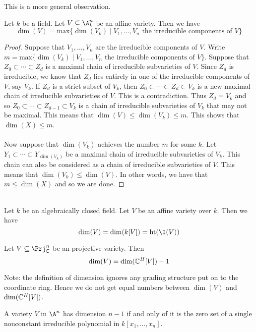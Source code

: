\documentclass[a4paper]{article}
\begin{document}
This is a more general observation. 

\begin{lmm}{}{} Let $k$ be a field. Let $V\subseteq\A_k^n$ be an affine variety. Then we have $$\dim(V)=\text{max}\{\dim(V_k)\;|\;V_1,\dots,V_n\text{ the irreducible components of }V\}$$ 
\begin{proof}
Suppose that $V_1,\dots,V_n$ are the irreducible components of $V$. Write $m=\text{max}\{\dim(V_k)\;|\;V_1,\dots,V_n\text{ the irreducible components of }V\}$. Suppose that $Z_0\subset\cdots\subset Z_d$ is a maximal chain of irreducible subvarieties of $V$. Since $Z_d$ is irreducible, we know that $Z_d$ lies entirely in one of the irreducible components of $V$, say $V_k$. If $Z_d$ is a strict subset of $V_k$, then $Z_0\subset\cdots\subset Z_d\subset V_k$ is a new maximal chain of irreducible subvarieties of $V$. This is a contradiction. Thus $Z_d=V_k$ and so $Z_0\subset\cdots\subset Z_{d-1}\subset V_k$ is a chain of irreducible subvarieties of $V_k$ that may not be maximal. This means that $\dim(V)\leq\dim(V_k)\leq m$. This shows that $\dim(X)\leq m$. \\~\\

Now suppose that $\dim(V_k)$ achieves the number $m$ for some $k$. Let $Y_1\subset\cdots\subset Y_{\dim(V_k)}$ be a maximal chain of irreducible subvarieties of $V_k$. This chain can also be considered as a chain of irreducible subvarieties of $V$. This means that $\dim(V_k)\leq\dim(V)$. In other words, we have that $m\leq\dim(X)$ and so we are done. 
\end{proof}
\end{lmm}

\begin{prp}{}{}\\
Let $k$ be an algebraically closed field. Let $V$ be an affine variety over $k$. Then we have $$\dim(V)=\dim(k[V])=\text{ht}(\I(V))$$
\end{prp}

\begin{prp}{}{} Let $V\subseteq\Prj_\C^n$ be an projective variety. Then $$\dim(V)=\dim(\mathbb{C}^H[V])-1$$
\end{prp}

Note: the definition of dimension ignores any grading structure put on to the coordinate ring. Hence we do not get equal numbers between $\dim(V)$ and $\dim(\mathbb{C}^H[V])$. 

\begin{prp}{}{} A variety $V$ in $\A^n$ has dimension $n-1$ if and only of it is the zero set of a single nonconstant irreducible polynomial in $k[x_1,\dots,x_n]$. 
\end{prp}
\end{document}
